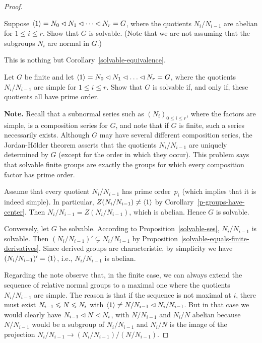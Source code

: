 \begin{proof}
\begin{probl}
    Suppose\/ $\langle1\rangle = N_0\lhd N_1 \lhd \cdots \lhd N_r = G$, where the quotients\/ $N_i / N_{i-1}$ are abelian for\/ $1\le i\le r$. Show that\/ $G$ is solvable. (Note that we are not assuming that the subgroups\/ $N_i$ are normal in\/ $G$.)
\end{probl}

\begin{solution} This is nothing but Corollary~\ref{solvable-equivalence}.  \end{solution}

\begin{probl}
    Let\/ $G$ be finite and let\/ $\gen1 = N_0\normal N_1\normal \dots\normal N_r = G$, where the quotients\/ $N_i/N_{i-1}$ are simple for\/ $1\le i\le r$. Show that\/ $G$ is solvable if, and only if, these quotients all have prime order.

    \textrm{\normalfont\textbf{Note.} Recall that a subnormal series such as $(N_i)_{0\le i\le r}$, where the factors are simple, is a composition series for $G$, and note that if $G$ is finite, such a series necessarily exists. Although $G$ may have several different composition series, the Jordan-H\"older theorem asserts that the quotients $N_i/N_{i-1}$ are uniquely determined by $G$ (except for the order in which they occur). This problem says that solvable finite groups are exactly the groups for which every composition factor has prime order.}
\end{probl}

\begin{solution} 
    Assume that every quotient $N_i/N_{i-1}$ has prime order~$p_i$ (which implies that it is indeed simple). In particular, $Z(N_i/N_{i-1})\ne\langle1\rangle$ by Corollary~\ref{p-groups-have-center}. Then $N_i/N_{i-1}=Z(N_i/N_{i-1})$, which is abelian. Hence $G$ is solvable.

    Conversely, let $G$ be solvable. According to Proposition~\ref{solvable-ses}, $N_i/N_{i-1}$ is solvable. Then $(N_i/N_{i-1})'\varsubsetneq N_i/N_{i-1}$ by Proposition~\ref{solvable-equals-finite-derivatives}. Since derived groups are characteristic, by simplicity we have $(N_i/N_{i-1})'=\langle1\rangle$, i.e., $N_i/N_{i-1}$ is abelian.
\end{solution}

Regarding the note observe that, in the finite case, we can always extend the sequence of relative normal groups to a maximal one where the quotients $N_i/N_{i-1}$ are simple. The reason is that if the sequence is not maximal at $i$, there must exist $N_{i-1}\leqslant N\leqslant N_i$ with $\langle1\rangle\ne N/N_{i-1}\lhd N_i/N_{i-1}$. But in that case we would clearly have $N_{i-1}\lhd N\lhd N_i$, with $N/N_{i-1}$ and $N_i/N$ abelian because $N/N_{i-1}$ would be a subgroup of $N_i/N_{i-1}$ and $N_i/N$ is the image of the projection $N_i/N_{i-1}\to (N_i/N_{i-1})/(N/N_{i-1})$.


\end{proof}
